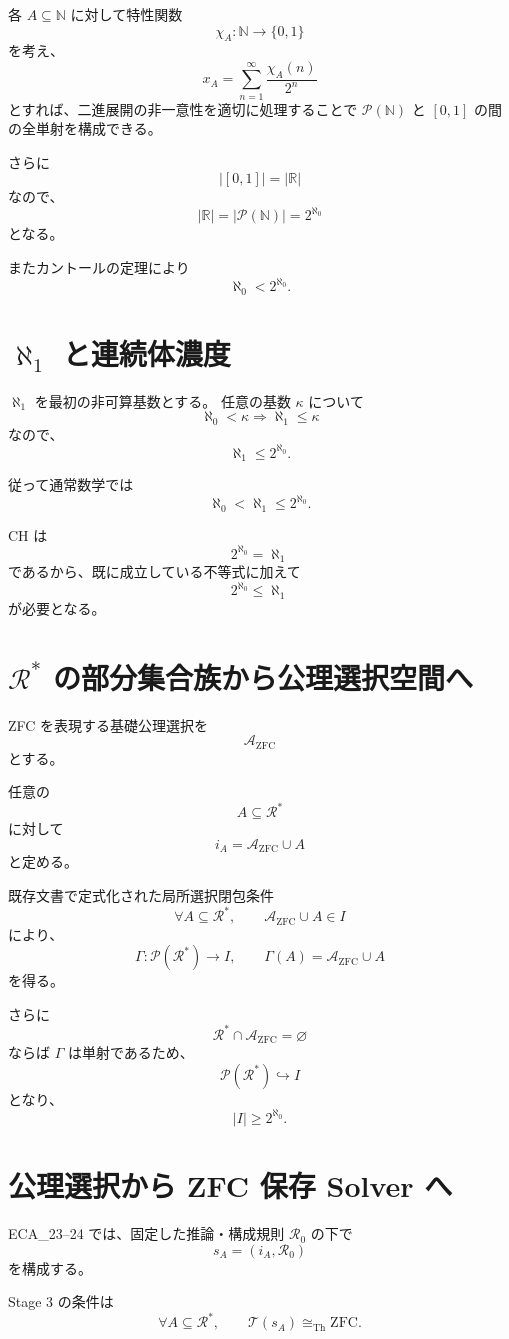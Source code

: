 \documentclass[11pt,a4paper]{article}
\newcommand{\Pow}{\mathcal P}
\newcommand{\Rstar}{\mathcal R^*}
\newcommand{\N}{\mathbb N}
\newcommand{\R}{\mathbb R}
\begin{document}
各 $A\subseteq\N$ に対して特性関数
\[
\chi_A:\N\to\{0,1\}
\]
を考え、
\[
x_A=
\sum_{n=1}^{\infty}\frac{\chi_A(n)}{2^n}
\]
とすれば、二進展開の非一意性を適切に処理することで
$\Pow(\N)$ と $[0,1]$ の間の全単射を構成できる。

さらに
\[
|[0,1]|=|\R|
\]
なので、
\[
\boxed{
|\R|=|\Pow(\N)|=2^{\aleph_0}
}
\]
となる。

またカントールの定理により
\[
\boxed{\aleph_0<2^{\aleph_0}}.
\]

\section{$\aleph_1$ と連続体濃度}

$\aleph_1$ を最初の非可算基数とする。
任意の基数 $\kappa$ について
\[
\aleph_0<\kappa\Longrightarrow\aleph_1\leq\kappa
\]
なので、
\[
\boxed{\aleph_1\leq2^{\aleph_0}}.
\]

従って通常数学では
\[
\boxed{
\aleph_0<\aleph_1\leq2^{\aleph_0}
}.
\]

CH は
\[
\boxed{2^{\aleph_0}=\aleph_1}
\]
であるから、既に成立している不等式に加えて
\[
2^{\aleph_0}\leq\aleph_1
\]
が必要となる。

\section{$\Rstar$ の部分集合族から公理選択空間へ}

ZFC を表現する基礎公理選択を
\[
\mathcal A_{\mathrm{ZFC}}
\]
とする。

任意の
\[
A\subseteq\Rstar
\]
に対して
\[
i_A=\mathcal A_{\mathrm{ZFC}}\cup A
\]
と定める。

既存文書で定式化された局所選択閉包条件
\[
\boxed{
\forall A\subseteq\Rstar,\qquad
\mathcal A_{\mathrm{ZFC}}\cup A\in I
}
\]
により、
\[
\Gamma:\Pow(\Rstar)\to I,
\qquad
\Gamma(A)=\mathcal A_{\mathrm{ZFC}}\cup A
\]
を得る。

さらに
\[
\Rstar\cap\mathcal A_{\mathrm{ZFC}}=\varnothing
\]
ならば $\Gamma$ は単射であるため、
\[
\Pow(\Rstar)\hookrightarrow I
\]
となり、
\[
\boxed{|I|\geq2^{\aleph_0}}.
\]

\section{公理選択から ZFC 保存 Solver へ}

ECA_23--24 では、固定した推論・構成規則 $\mathcal R_0$ の下で
\[
s_A=(i_A,\mathcal R_0)
\]
を構成する。

Stage 3 の条件は
\[
\boxed{
\forall A\subseteq\Rstar,\qquad
\mathcal T(s_A)\cong_{\mathrm{Th}}\mathrm{ZFC}
}.
\]
\end{document}
